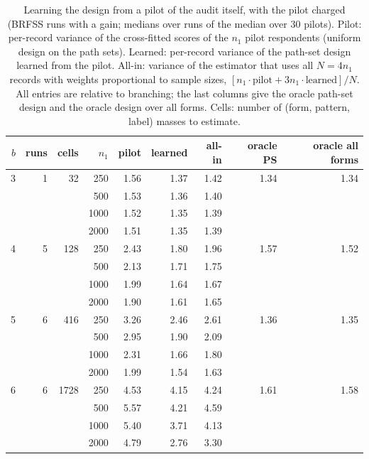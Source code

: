 \begin{table}[h]
\centering
\caption{Learning the design from a pilot of the audit itself, with the pilot charged (BRFSS runs with a gain; medians over runs of the median over 30 pilots). Pilot: per-record variance of the cross-fitted scores of the $n_1$ pilot respondents (uniform design on the path sets). Learned: per-record variance of the path-set design learned from the pilot. All-in: variance of the estimator that uses all $N=4n_1$ records with weights proportional to sample sizes, $[n_1\cdot\text{pilot}+3n_1\cdot\text{learned}]/N$. All entries are relative to branching; the last columns give the oracle path-set design and the oracle design over all forms. Cells: number of (form, pattern, label) masses to estimate.}
\label{tab:pilot}
\small
\begin{tabular}{rrrrrrrrr}
\toprule
$b$ & runs & cells & $n_1$ & pilot & learned & all-in & oracle PS & oracle all forms \\
\midrule
3 & 1 & 32 & 250 & 1.56 & 1.37 & 1.42 & 1.34 & 1.34 \\
 &  &  & 500 & 1.53 & 1.36 & 1.40 &  &  \\
 &  &  & 1000 & 1.52 & 1.35 & 1.39 &  &  \\
 &  &  & 2000 & 1.51 & 1.35 & 1.39 &  &  \\
4 & 5 & 128 & 250 & 2.43 & 1.80 & 1.96 & 1.57 & 1.52 \\
 &  &  & 500 & 2.13 & 1.71 & 1.75 &  &  \\
 &  &  & 1000 & 1.99 & 1.64 & 1.67 &  &  \\
 &  &  & 2000 & 1.90 & 1.61 & 1.65 &  &  \\
5 & 6 & 416 & 250 & 3.26 & 2.46 & 2.61 & 1.36 & 1.35 \\
 &  &  & 500 & 2.95 & 1.90 & 2.09 &  &  \\
 &  &  & 1000 & 2.31 & 1.66 & 1.80 &  &  \\
 &  &  & 2000 & 1.99 & 1.54 & 1.63 &  &  \\
6 & 6 & 1728 & 250 & 4.53 & 4.15 & 4.24 & 1.61 & 1.58 \\
 &  &  & 500 & 5.57 & 4.21 & 4.59 &  &  \\
 &  &  & 1000 & 5.40 & 3.71 & 4.13 &  &  \\
 &  &  & 2000 & 4.79 & 2.76 & 3.30 &  &  \\
\bottomrule
\end{tabular}
\end{table}
